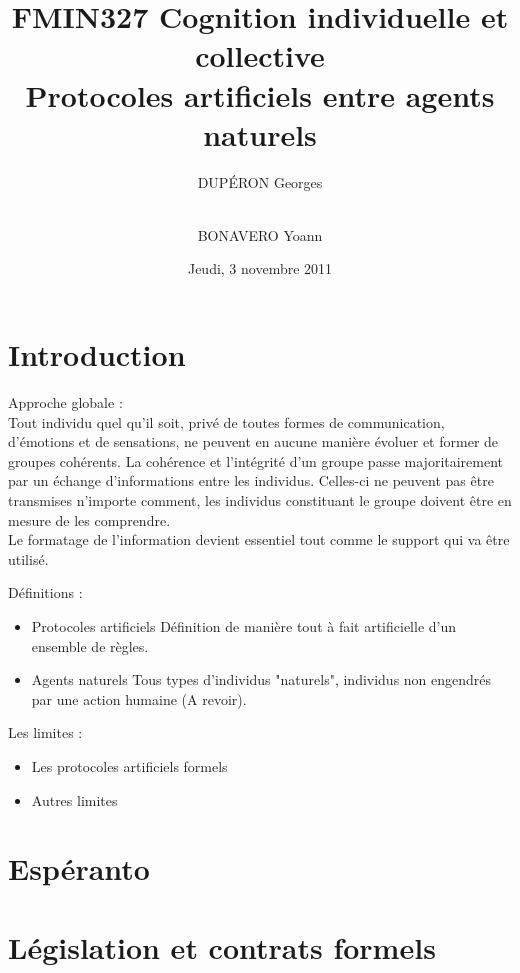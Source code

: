 \documentclass{beamer}
\title{FMIN327 Cognition individuelle et collective\\ Protocoles artificiels entre agents naturels}
\author{DUPÉRON Georges \and\\ BONAVERO Yoann}
\institute{Université Montpellier II, Département informatique  \\ Master 2 IFPRU \\ Sous la direction de Monsieur Jacques Ferber}
\date{Jeudi, 3 novembre 2011}
\renewcommand*{\figurename}{}
\begin{document}
\renewcommand*{\figurename}{}

\begin{frame}
  \titlepage
\end{frame}

\section{Introduction}

\begin{frame}
Approche globale :
\\ Tout individu quel qu'il soit, privé de toutes formes de communication, d'émotions et de sensations, ne peuvent
en aucune manière évoluer et former de groupes cohérents. La cohérence et l'intégrité d'un groupe passe majoritairement
par un échange d'informations entre les individus. Celles-ci ne peuvent pas être transmises n'importe
comment, les individus constituant le groupe doivent être en mesure de les comprendre.
\\ Le formatage de l'information devient essentiel tout comme le support qui va être utilisé.
\newline 
\end{frame}

\begin{frame}
Définitions :
\begin{itemize}
	\item Protocoles artificiels
	Définition de manière tout à fait artificielle d'un ensemble de règles.
	\item Agents naturels
	Tous types d'individus "naturels", individus non engendrés par une action humaine (A revoir).
\end{itemize}
\end{frame}

\begin{frame}
Les limites :
\begin{itemize}
	\item Les protocoles artificiels formels
	\item Autres limites
\end{itemize}
\end{frame}

\section{Espéranto}

\begin{frame}  
\end{frame}
\section[Contrats]{Législation et contrats formels}
\end{document}
